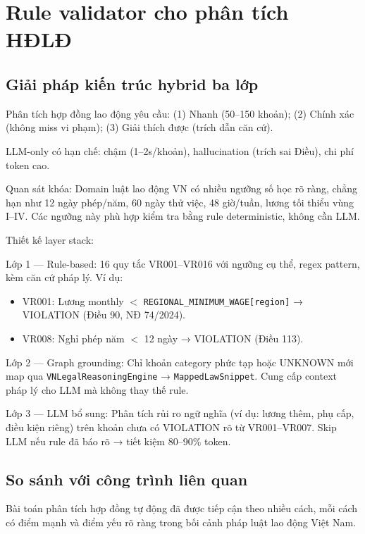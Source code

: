 \documentclass[../DoAn.tex]{subfiles}
\begin{document}
\section{Rule validator cho phân tích HĐLĐ}
\label{section:5.3}

\subsection{Giải pháp kiến trúc hybrid ba lớp}
\label{subsection:5.3.2}

Phân tích hợp đồng lao động yêu cầu: (1) Nhanh (50--150 khoản); (2) Chính xác (không miss vi phạm); (3) Giải thích được (trích dẫn căn cứ).

LLM-only có hạn chế: chậm (1--2s/khoản), hallucination (trích sai Điều), chi phí token cao.

Quan sát khóa: Domain luật lao động VN có nhiều ngưỡng số học rõ ràng, chẳng hạn như 12 ngày phép/năm, 60 ngày thử việc, 48 giờ/tuần, lương tối thiểu vùng I--IV. Các ngưỡng này phù hợp kiểm tra bằng rule deterministic, không cần LLM.

Thiết kế layer stack:

Lớp 1 --- Rule-based: 16 quy tắc VR001--VR016 với ngưỡng cụ thể, regex pattern, kèm căn cứ pháp lý. Ví dụ:
\begin{itemize}[nosep, leftmargin=*]
    \item VR001: Lương monthly $<$ \texttt{REGIONAL\_MINIMUM\_WAGE[region]} → VIOLATION (Điều 90, NĐ 74/2024).
    \item VR008: Nghỉ phép năm $<$ 12 ngày → VIOLATION (Điều 113).
\end{itemize}

Lớp 2 --- Graph grounding: Chỉ khoản category phức tạp hoặc UNKNOWN mới map qua \texttt{VNLegalReasoningEngine} → \texttt{MappedLawSnippet}. Cung cấp context pháp lý cho LLM mà không thay thế rule.

Lớp 3 --- LLM bổ sung: Phân tích rủi ro ngữ nghĩa (ví dụ: lương thêm, phụ cấp, điều kiện riêng) trên khoản chưa có VIOLATION rõ từ VR001--VR007. Skip LLM nếu rule đã báo rõ → tiết kiệm 80--90\% token.

\subsection{So sánh với công trình liên quan}
\label{subsection:5.3.3}

Bài toán phân tích hợp đồng tự động đã được tiếp cận theo nhiều cách, mỗi cách có điểm mạnh và điểm yếu rõ ràng trong bối cảnh pháp luật lao động Việt Nam.
\end{document}
